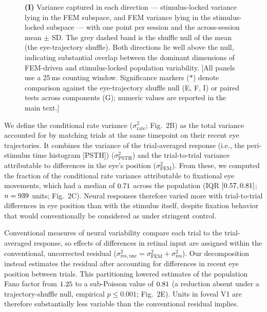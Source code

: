 \documentclass{lite}
\begin{document}
\begin{figure}[!t]
{  \textbf{(I)} Variance captured in each direction --- stimulus-locked variance lying in the FEM subspace, and FEM variance lying in the stimulus-locked subspace --- with one point per session and the across-session mean $\pm$ SD. The grey dashed band is the shuffle null of the mean (the eye-trajectory shuffle). Both directions lie well above the null, indicating substantial overlap between the dominant dimensions of FEM-driven and stimulus-locked population variability. [All panels use a 25\,ms counting window. Significance markers ($\ast$) denote comparison against the eye-trajectory shuffle null (E, F, I) or paired tests across components (G); numeric values are reported in the main text.]}
\end{figure}


We define the conditional rate variance ($\sigma^2_{\text{rate}}$; Fig.~2B) as the total variance accounted for by matching trials at the same timepoint on their recent eye trajectories. It combines the variance of the trial-averaged response (i.e., the peri-stimulus time histogram [PSTH]) ($\sigma^2_{\text{PSTH}}$) and the trial-to-trial variance attributable to differences in the eye's position ($\sigma^2_{\text{FEM}}$). 
From these, we computed the fraction of the conditional rate variance attributable to fixational eye movements, which had a median of $0.71$ across the population (IQR $[0.57, 0.81]$; $n=939$ units; Fig.~2C). Neural responses therefore varied more with trial-to-trial differences in eye position than with the stimulus itself, despite fixation behavior that would conventionally be considered as under stringent control. 

Conventional measures of neural variability compare each trial to the trial-averaged response, so effects of differences in retinal input are assigned within the conventional, uncorrected residual ($\sigma^{2}_{\text{res},\mathrm{unc}} = \sigma^2_{\text{FEM}} + \sigma^2_{\text{res}}$). Our decomposition instead estimates the residual after accounting for differences in recent eye position between trials. This partitioning lowered estimates of the population Fano factor from $1.25$ to a sub-Poisson value of $0.81$ (a reduction absent under a trajectory-shuffle null, empirical $p \leq 0.001$; Fig.~2E). Units in foveal V1 are therefore substantially less variable than the conventional residual implies.
\end{document}
